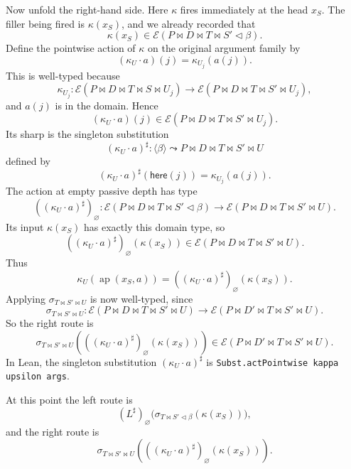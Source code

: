 \documentclass[11pt]{article}
\newcommand{\E}{\mathcal E}
\newcommand{\ext}{\mathbin{\triangleleft}}
\begin{document}
Now unfold the right-hand side.  Here \(\kappa\) fires immediately at the head
\(x_S\).  The filler being fired is \(\kappa(x_S)\), and we already recorded
that
\[
  \kappa(x_S)
  \in
  \E(P \bowtie D \bowtie T \bowtie S' \ext \beta).
\]
Define the pointwise action of \(\kappa\) on the original argument family by
\[
  (\kappa_U \cdot a)(j)
  =
  \kappa_{U_j}(a(j)).
\]
This is well-typed because
\[
  \kappa_{U_j} :
  \E(P \bowtie D \bowtie T \bowtie S \bowtie U_j)
  \to
  \E(P \bowtie D \bowtie T \bowtie S' \bowtie U_j),
\]
and \(a(j)\) is in the domain.  Hence
\[
  (\kappa_U \cdot a)(j)
  \in
  \E(P \bowtie D \bowtie T \bowtie S' \bowtie U_j).
\]
Its sharp is the singleton substitution
\[
  (\kappa_U \cdot a)^\sharp :
  \langle\beta\rangle
  \leadsto
  P \bowtie D \bowtie T \bowtie S' \bowtie U
\]
defined by
\[
  (\kappa_U \cdot a)^\sharp(\mathsf{here}(j))
  =
  \kappa_{U_j}(a(j)).
\]
The action at empty passive depth has type
\[
  ((\kappa_U \cdot a)^\sharp)_\varnothing :
  \E(P \bowtie D \bowtie T \bowtie S' \ext \beta)
  \to
  \E(P \bowtie D \bowtie T \bowtie S' \bowtie U).
\]
Its input \(\kappa(x_S)\) has exactly this domain type, so
\[
  ((\kappa_U \cdot a)^\sharp)_\varnothing(\kappa(x_S))
  \in
  \E(P \bowtie D \bowtie T \bowtie S' \bowtie U).
\]
Thus
\[
  \kappa_U(\operatorname{ap}(x_S,a))
  =
  ((\kappa_U \cdot a)^\sharp)_\varnothing(\kappa(x_S)).
\]
Applying \(\sigma_{T \bowtie S' \bowtie U}\) is now well-typed, since
\[
  \sigma_{T \bowtie S' \bowtie U} :
  \E(P \bowtie D \bowtie T \bowtie S' \bowtie U)
  \to
  \E(P \bowtie D' \bowtie T \bowtie S' \bowtie U).
\]
So the right route is
\[
  \sigma_{T \bowtie S' \bowtie U}
  \left(
    ((\kappa_U \cdot a)^\sharp)_\varnothing(\kappa(x_S))
  \right)
  \in
  \E(P \bowtie D' \bowtie T \bowtie S' \bowtie U).
\]
In Lean, the singleton substitution \((\kappa_U \cdot a)^\sharp\) is
\texttt{Subst.actPointwise kappa upsilon args}.

At this point the left route is
\[
  (L^\sharp)_\varnothing
  \bigl(\sigma_{T \bowtie S' \ext \beta}(\kappa(x_S))\bigr),
\]
and the right route is
\[
  \sigma_{T \bowtie S' \bowtie U}
  \left(
    ((\kappa_U \cdot a)^\sharp)_\varnothing(\kappa(x_S))
  \right).
\]
\end{document}
